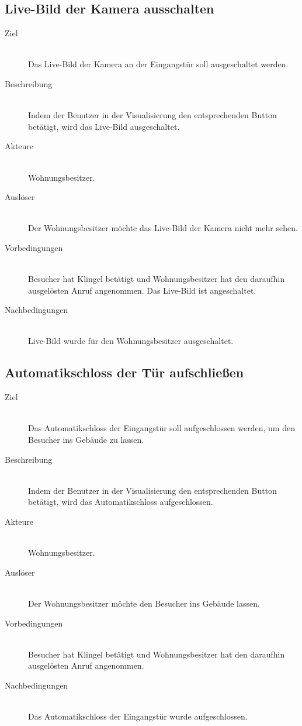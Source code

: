 \subsection{Live-Bild der Kamera ausschalten}\label{subsec:live-Bild-der-kamera-ausschalten}
    \begin{description}
        \item[Ziel]\hfill \\
        Das Live-Bild der Kamera an der Eingangstür soll ausgeschaltet werden.
        \item[Beschreibung]\hfill \\
        Indem der Benutzer in der Visualisierung den entsprechenden Button betätigt, wird das Live-Bild ausgeschaltet.
        \item[Akteure]\hfill \\
        Wohnungsbesitzer.
        \item[Auslöser]\hfill \\
        Der Wohnungsbesitzer möchte das Live-Bild der Kamera nicht mehr sehen.
        \item[Vorbedingungen]\hfill \\
        Besucher hat Klingel betätigt und Wohnungsbesitzer hat den daraufhin ausgelösten Anruf angenommen.
        Das Live-Bild ist angeschaltet.
        \item[Nachbedingungen]\hfill \\
        Live-Bild wurde für den Wohnungsbesitzer ausgeschaltet.
        \end{description}

\subsection{Automatikschloss der Tür aufschließen}\label{subsec:automatikschloss-der-tür-aufschließen}
    \begin{description}
        \item[Ziel]\hfill \\
        Das Automatikschloss der Eingangstür soll aufgeschlossen werden, um den Besucher ins Gebäude zu lassen.
        \item[Beschreibung]\hfill \\
        Indem der Benutzer in der Visualisierung den entsprechenden Button betätigt, wird das Automatikschloss aufgeschlossen.
        \item[Akteure]\hfill \\
        Wohnungsbesitzer.
        \item[Auslöser]\hfill \\
        Der Wohnungsbesitzer möchte den Besucher ins Gebäude lassen.
        \item[Vorbedingungen]\hfill \\
        Besucher hat Klingel betätigt und Wohnungsbesitzer hat den daraufhin ausgelösten Anruf angenommen.
        \item[Nachbedingungen]\hfill \\
        Das Automatikschloss der Eingangstür wurde aufgeschlossen.
        \end{description}

